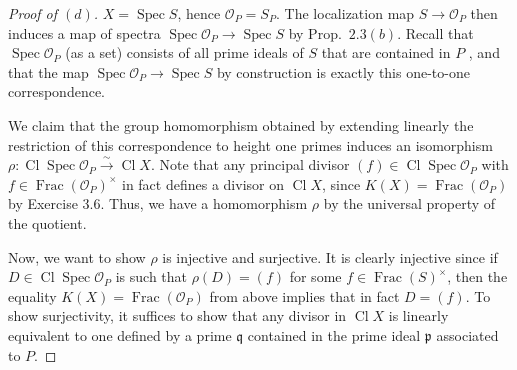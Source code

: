 \documentclass[10pt]{article}
\theoremstyle{definition}
\theoremstyle{remark}
\numberwithin{equation}{section}
\numberwithin{figure}{subsubsection}
\DeclareMathOperator{\Spec}{Spec}
\DeclareMathOperator{\Frac}{Frac}
\DeclareMathOperator{\Cl}{Cl}
\newcommand{\OO}{\mathcal{O}}
\newcommand{\isoto}{\overset{\sim}{\to}}
\begin{document}
\begin{proof}[Proof of $(d)$]
  $X = \Spec S$, hence $\OO_P = S_P$. The localization map $S \to \OO_P$ then induces a map of spectra $\Spec \OO_P \to \Spec S$ by Prop.~$2.3(b)$. Recall that $\Spec \OO_P$ (as a set) consists of all prime ideals of $S$ that are contained in $P$ \cite[Cor.~3.13]{AM69}, and that the map $\Spec \OO_P \to \Spec S$ by construction is exactly this one-to-one correspondence.
  \par We claim that the group homomorphism obtained by extending linearly the restriction of this correspondence to height one primes induces an isomorphism $\rho\colon \Cl \Spec \OO_P \isoto \Cl X$. Note that any principal divisor $(f) \in \Cl \Spec \OO_P$ with $f \in \Frac(\OO_P)^\times$ in fact defines a divisor on $\Cl X$, since $K(X) = \Frac(\OO_P)$ by Exercise $3.6$. Thus, we have a homomorphism $\rho$ by the universal property of the quotient.
  \par Now, we want to show $\rho$ is injective and surjective. It is clearly injective since if $D \in \Cl \Spec \OO_P$ is such that $\rho(D) = (f)$ for some $f \in \Frac(S)^\times$, then the equality $K(X) = \Frac(\OO_P)$ from above implies that in fact $D = (f)$. To show surjectivity, it suffices to show that any divisor in $\Cl X$ is linearly equivalent to one defined by a prime $\mathfrak{q}$ contained in the prime ideal $\mathfrak{p}$ associated to $P$.
\end{proof}
\end{document}
